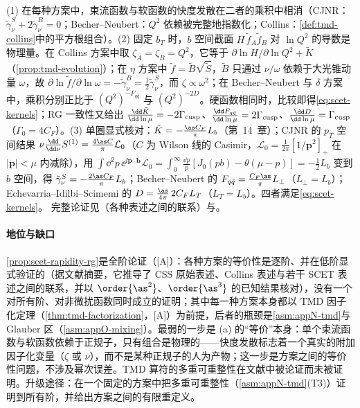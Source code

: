 \begin{proofsketch}
(1) 在每种方案中，束流函数与软函数的快度发散在二者的乘积中相消（CJNR：$\tilde\gamma^S_\nu+2\tilde\gamma^B_\nu=0$\cite{ChiuEtAl2012b}；Becher--Neubert：$Q^2$ 依赖被完整地指数化\cite{BecherNeubert2011}；Collins：\cref{def:tmd-collins}中的平方根组合）。(2) 固定 $b_T$ 时，$b$ 空间截面 $H\,\tilde f_A\tilde f_B$ 对 $\ln Q^2$ 的导数是物理量。在 Collins 方案中取 $\zeta_A=\zeta_B=Q^2$，它等于 $\partial\ln H/\partial\ln Q^2+\tilde K$（\cref{prop:tmd-evolution}）；在 $\eta$ 方案中 $\tilde f=\tilde B\sqrt{\tilde S}$，$\tilde B$ 只通过 $\nu/\omega$ 依赖于大光锥动量 $\omega$，故 $\partial\ln\tilde f/\partial\ln\omega=-\tilde\gamma^B_\nu=\frac12\tilde\gamma^S_\nu$，而 $\zeta\propto\omega^2$；在 Becher--Neubert 与 $\delta$ 方案中，乘积分别正比于 $(Q^2)^{-F_{q\bar q}}$ 与 $(Q^2)^{-2D}$。硬函数相同时，比较即得\cref{eq:scet-kernels}；RG 一致性又给出 $\frac{\dd\tilde K}{\dd\ln\mu}=-2\Gamma_{\rm cusp}$、$\frac{\dd F_{q\bar q}}{\dd\ln\mu}=2\Gamma_{\rm cusp}$、$\frac{\dd D}{\dd\ln\mu}=\Gamma_{\rm cusp}$（$\Gamma_0=4C_F$）。(3) 单圈显式核对：$\tilde K=-\frac{\as C_F}\pi L_b$（第~14~章）；CJNR 的 $p_T$ 空间结果 $\nu\frac{\dd}{\dd\nu}S^{(1)}=\frac{4\as C}{\pi}\mathcal L_0$\cite{ChiuEtAl2012b}（$C$ 为 Wilson 线的 Casimir，$\mathcal L_0=\frac1{2\pi}[1/\bm p^2]_+$ 在 $|\bm p|<\mu$ 内减除），用 $\int\dd^2p\,\ee^{\ii\bm p\cdot\bm b}\mathcal L_0=\int_0^\infty\frac{\dd p}p[J_0(pb)-\theta(\mu-p)]=-\frac12L_b$ 变到 $b$ 空间，得 $\tilde\gamma^S_\nu=-\frac{2\as C_F}{\pi}L_b$；Becher--Neubert 的 $F_{q\bar q}=\frac{C_F\as}\pi L_\perp$（$L_\perp=L_b$）\cite{BecherNeubert2011}；Echevarria--Idilbi--Scimemi 的 $D=\frac{\as}{4\pi}\,2C_FL_T$（$L_T=L_b$）\cite{EchevarriaIdilbiScimemi2012}。四者满足\cref{eq:scet-kernels}。%
完整论证见\cite{Collins:2017oxh}（各种表述之间的联系）与\cite{ChiuEtAl2012b,BecherNeubert2011,EchevarriaIdilbiScimemi2012}。
\end{proofsketch}

\paragraph{地位与缺口}
\cref{prop:scet-rapidity-rg}是全阶论证（[A]）：各种方案的等价性是逐阶、并在低阶显式验证的（据文献\cite{Collins:2017oxh}摘要，它推导了 CSS 原始表述、Collins 表述与若干 SCET 表述之间的联系，并以 $\order{\as^2}$、$\order{\as^3}$ 的已知结果核对），没有一个对所有阶、对非微扰函数同时成立的证明；其中每一种方案本身都以 TMD 因子化定理（\cref{thm:tmd-factorization}，[A]）为前提，后者的瓶颈是\cref{asm:appN-tmd}与 Glauber 区（\cref{asm:appO-mixing}）。最弱的一步是 (a) 的“等价”本身：单个束流函数与软函数依赖于正规子，只有组合是物理的——快度发散标志着一个真实的附加因子化变量（$\zeta$ 或 $\nu$），而不是某种正规子的人为产物；这一步是方案之间的等价性问题，不涉及幂次误差。TMD 算符的多重可重整性在文献中被论证而未被证明\cite[第~13~章]{Collins2011}。升级途径：在一个固定的方案中把多重可重整性（\cref{asm:appN-tmd}(T3)）证明到所有阶，并给出方案之间的有限重定义。
